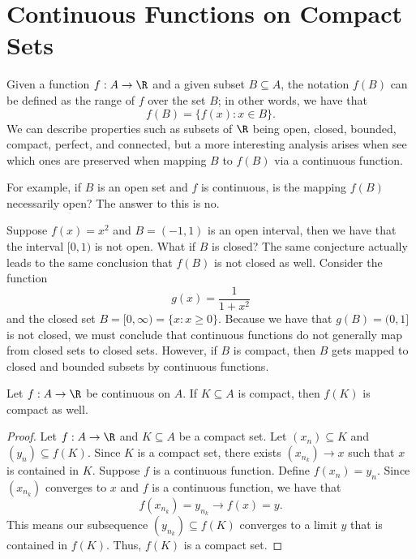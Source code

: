 

\section{Continuous Functions on Compact Sets}

Given a function \( f: A \to \R  \) and a given subset \( B \subseteq A  \), the notation \( f(B) \) can be defined as the range of \( f \) over the set \( B  \); in other words, we have that 
\[  f(B) = \{ f(x) : x \in B  \}.  \]
We can describe properties such as subsets of \( \R  \) being open, closed, bounded, compact, perfect, and connected, but a more interesting analysis arises when see which ones are preserved when mapping \( B  \) to \( f(B) \) via a continuous function. 

For example, if \( B  \) is an open set and \( f \) is continuous, is the mapping \( f(B) \) necessarily open? The answer to this is no.  

Suppose \( f(x) =x^2  \) and \( B = (-1,1) \) is an open interval, then we have that the interval \( [0,1) \) is not open. What if \( B  \) is closed? The same conjecture actually leads to the same conclusion that \( f(B) \) is not closed as well. Consider the function
\[  g(x) = \frac{ 1 }{ 1 + x^2  }   \]
and the closed set \( B = [0, \infty ) = \{ x : x \geq 0  \}  \). Because we have that \( g(B) = (0,1] \) is not closed, we must conclude that continuous functions do not generally map from closed sets to closed sets. However, if \( B  \) is compact, then \( B  \) gets mapped to closed and bounded subsets by continuous functions.

\begin{tcolorbox}
    \begin{thm}
    Let \( f: A \to \R  \) be continuous on \( A  \). If \( K \subseteq A  \) is compact, then \( f(K)  \) is compact as well.
    \end{thm}
\end{tcolorbox}

\begin{proof}
    Let \(  f: A \to \R  \) and \( K \subseteq A  \) be a compact set. Let \( (x_n) \subseteq K \) and \( (y_n) \subseteq f(K) \). Since \( K  \) is a compact set, there exists \( (x_{n_k}) \to x  \) such that \( x  \) is contained in \( K  \). Suppose \( f  \) is a continuous function. Define \( f(x_n) = y_n \). Since \( (x_{n_k}) \) converges to \( x  \) and \( f  \) is a continuous function, we have that 
    \[  f(x_{n_k}) = y_{n_k} \to f(x) = y. \]
    This means our subsequence \( (y_{n_k}) \subseteq f(K) \) converges to a limit \( y \) that is contained in \( f(K) \). Thus, \( f(K)  \) is a compact set.
\end{proof}

